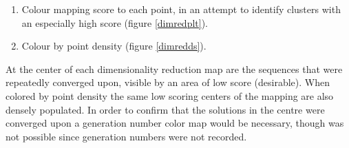 \documentclass[16pt]{article}
\begin{document}
\begin{enumerate}
	\item Colour mapping score to each point, in an attempt to identify clusters with an especially high score (figure \ref{dimredplt}).
	\item Colour by point density (figure \ref{dimredds}).
\end{enumerate}

At the center of each dimensionality reduction map are the sequences that were repeatedly converged upon, visible by an area of low score (desirable).
When colored by point density the same low scoring centers of the mapping are also densely populated.
In order to confirm that the solutions in the centre were converged upon a generation number color map would be necessary, though was not possible since generation numbers were not recorded.
\end{document}
